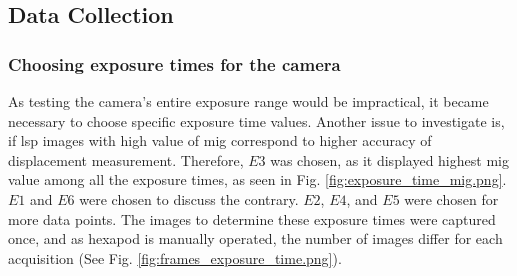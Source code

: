 
    
\subsection{Data Collection}\label{section:data_collection}
    \subsubsection*{Choosing exposure times for the camera}
        As testing the camera's entire exposure range would be impractical, it became necessary to choose specific exposure time values. Another issue to investigate is, if \gls{lsp} images with high value of \gls{mig} correspond to higher accuracy of displacement measurement. Therefore, $E3$ was chosen, as it displayed highest \gls{mig} value among all the exposure times, as seen in Fig. \ref{fig:exposure_time_mig.png}. $E1$ and $E6$ were chosen to discuss the contrary. $E2$, $E4$, and $E5$ were chosen for more data points. The images to determine these exposure times were captured once, and as hexapod is manually operated, the number of images differ for each acquisition (See Fig. \ref{fig:frames_exposure_time.png}).

